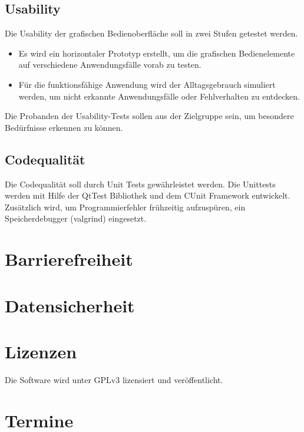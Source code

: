 \documentclass[a4paper,10pt]{article}
\begin{document}
\subsection{Usability}
Die Usability der grafischen Bedienoberfläche soll in zwei Stufen getestet werden.
\begin{itemize}
\item Es wird ein horizontaler Prototyp erstellt,  um die grafischen Bedienelemente auf verschiedene Anwendungsfälle vorab zu testen. 
\item Für die funktionsfähige Anwendung wird der Alltagsgebrauch simuliert werden, um nicht erkannte Anwendungsfälle oder Fehlverhalten zu entdecken.
\end{itemize}
Die Probanden der Usability-Tests sollen aus der Zielgruppe sein, um besondere Bedürfnisse erkennen zu können.    

\subsection{Codequalität}
Die Codequalität soll durch Unit Tests gewährleistet werden.
Die Unittests werden mit Hilfe der QtTest Bibliothek und dem CUnit Framework entwickelt.
Zusätzlich wird, um Programmierfehler frühzeitig aufzuspüren, ein Speicherdebugger (valgrind) eingesetzt.


\section{Barrierefreiheit}
\section{Datensicherheit}
\section{Lizenzen}
Die Software wird unter GPLv3 lizensiert und veröffentlicht.
\section{Termine}
\end{document}
